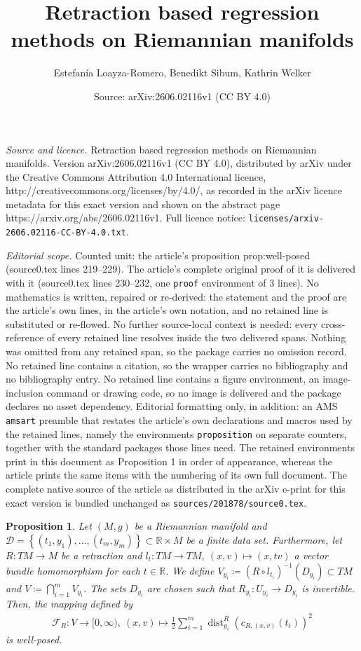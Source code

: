 \documentclass[10pt,a4paper]{amsart}
\title{Retraction based regression methods on Riemannian manifolds}
\author{Estefan\'ia Loayza-Romero, Benedikt Sibum, Kathrin Welker}
\date{Source: arXiv:2606.02116v1 (CC BY 4.0)}
\newtheorem{proposition}{Proposition}
\newcommand{\RR}{\mathbb{R}}
\DeclareMathOperator{\dist}{dist}
\begin{document}
\maketitle

\noindent\emph{Source and licence.} Retraction based regression methods on Riemannian manifolds. Version arXiv:2606.02116v1 (CC BY 4.0), distributed by arXiv under the Creative Commons Attribution 4.0 International licence, http://creativecommons.org/licenses/by/4.0/, as recorded in the arXiv licence metadata for this exact version and shown on the abstract page https://arxiv.org/abs/2606.02116v1. Full licence notice: \texttt{licenses/arxiv-2606.02116-CC-BY-4.0.txt}.\par\smallskip

\noindent\textit{Editorial scope.} Counted unit: the article's proposition prop:well-posed (source0.tex lines 219--229). The article's complete original proof of it is delivered with it (source0.tex lines 230--232, one \texttt{proof} environment of 3 lines). No mathematics is written, repaired or re-derived: the statement and the proof are the article's own lines, in the article's own notation, and no retained line is substituted or re-flowed.  No further source-local context is needed: every cross-reference of every retained line resolves inside the two delivered spans.  Nothing was omitted from any retained span, so the package carries no omission record.  No retained line contains a citation, so the wrapper carries no bibliography and no bibliography entry.  No retained line contains a figure environment, an image-inclusion command or drawing code, so no image is delivered and the package declares no asset dependency.  Editorial formatting only, in addition: an AMS \texttt{amsart} preamble that restates the article's own declarations and macros used by the retained lines, namely the environments \texttt{proposition} on separate counters, together with the standard packages those lines need.  The retained environments print in this document as Proposition 1 in order of appearance, whereas the article prints the same items with the numbering of its own full document.  The complete native source of the article as distributed in the arXiv e-print for this exact version is bundled unchanged as \texttt{sources/201878/source0.tex}.
\begin{proposition}
	\label{prop:well-posed}
	Let $(M, g)$ be a Riemannian manifold and $\mathcal{D} = \left\{(t_1, y_1), \ldots, (t_m, y_m)\right\}\subset \RR\times M$ be a finite data set.  Furthermore, let $R\colon TM\to M$ be a retraction and $l_t\colon TM\to TM,\  (x, v)\mapsto (x, tv)$ a vector bundle homomorphism for each $t\in\RR$. We define $V_{y_i}\coloneqq (R\circ l_{t_i})^{-1}(D_{y_i})\subset TM$ and $V\coloneqq \bigcap\limits_{i=1}^m V_{y_i}$. The sets $D_{y_i}$ are chosen such that $R_{y_i} \colon U_{y_i} \to D_{y_i}$ is invertible.
	Then, the mapping defined by 
	\begin{align}
		\label{map: objective function}
		\mathcal{F}_R\colon V\to [0, \infty),\
		(x, v)\mapsto \frac{1}{2} \sum\limits_{i=1}^m \dist_{y_i}^R\left(c_{R, (x, v)}(t_i)\right)^2
	\end{align}
	is well-posed. 
\end{proposition}
\end{document}
